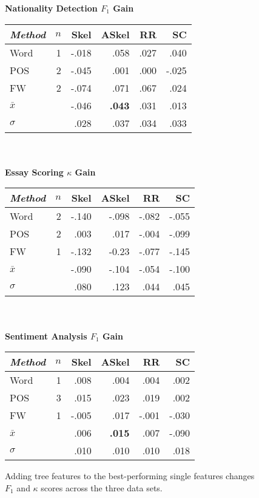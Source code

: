 \begin{figure}[t!]
\begin{center}

    \textbf{Nationality Detection $F_1$ Gain} \\
    \begin{tabular}{|lrrrrr|}
    \hline
    \emph{Method} & $n$ & Skel & ASkel & RR & SC \\
    \hline
    Word & 1 &  -.018  & .058 & .027 & .040 \\
    POS  & 2 &  -.045  & .001 & .000 & -.025 \\
    FW   & 2 &  -.074  & .071 & .067 & .024 \\
    \hline
    $\bar{x}$ && -.046  & \textbf{.043} & .031 & .013 \\
    $\sigma$  && .028 & .037 & .034 & .033 \\
    \hline
    \end{tabular} \\ ~ \\

    \textbf{Essay Scoring $\kappa$ Gain} \\
    \begin{tabular}{|lrrrrr|}
    \hline
    \emph{Method} & $n$ & Skel & ASkel & RR & SC \\
    \hline
    Word & 2 &  -.140  & -.098 & -.082 & -.055 \\
    POS  & 2 &  .003  & .017 & -.004 & -.099 \\
    FW   & 1 &  -.132  & -0.23 & -.077 & -.145 \\
    \hline
    $\bar{x}$ && -.090  & -.104 & -.054 & -.100 \\
    $\sigma$  && .080 & .123 & .044 & .045 \\
    \hline
    \end{tabular} \\ ~ \\
    
    \textbf{Sentiment Analysis $F_1$ Gain} \\
    \begin{tabular}{|lrrrrr|}
    \hline
    \emph{Method} & $n$ & Skel & ASkel & RR & SC \\
    \hline
    Word & 1 &  .008  & .004 & .004 & .002 \\
    POS  & 3 &  .015  & .023 & .019 & .002 \\
    FW   & 1 &  -.005  & .017 & -.001 & -.030 \\
    \hline
    $\bar{x}$ && .006 & \textbf{.015} & .007 & -.090 \\
    $\sigma$  && .010 & .010 & .010 & .018 \\
    \hline
    \end{tabular}

\caption{
{\normalsize
Adding tree features to the best-performing single
features changes $F_1$ and $\kappa$ scores across the three data sets.
}}
\label{fig:multiple-features}
\end{center}

\end{figure}
